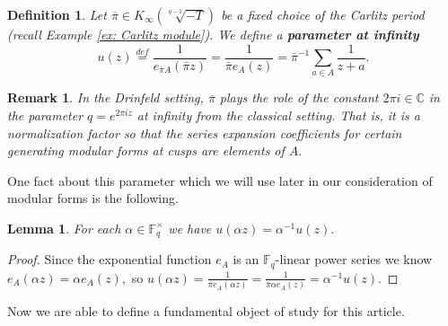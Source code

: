 \documentclass[11pt]{amsart}
\newtheorem{lemma}[theorem]{Lemma}
\newtheorem{definition}[theorem]{Definition}
\newtheorem{remark}[theorem]{Remark}
\theoremstyle{definition}
\newenvironment{psmallmatrix}
{\left(\begin{smallmatrix}}
	{\end{smallmatrix}\right)}
\numberwithin{equation}{section}
\newcommand{\GL}{\mathrm{GL}} 	%
\newcommand{\bbC}{\mathbb{C}}		%
\newcommand{\bbF}{\mathbb{F}}		%
\newcommand{\bbZ}{\mathbb{Z}}		%
\begin{document}
		\begin{definition}\label{d: parameter at infty}
			Let $\overline{\pi}\in K_{\infty}(\sqrt[q-1]{-T})$ be a fixed choice of the Carlitz period (recall Example \ref{ex: Carlitz module}). We define a \textbf{parameter at infinity} 
			\[u(z)\overset{def}{=}\frac{1}{e_{\overline{\pi}A}(\bar{\pi}z)}=\frac{1}{\bar{\pi}e_A(z)}=\bar{\pi}^{-1}\sum_{a\in A}\frac{1}{z+a}.\]
		\end{definition}
		\begin{remark}
			In the Drinfeld setting, $\overline{\pi}$ plays the role of the constant $2\pi i\in \bbC$ in the parameter $q=e^{2\pi i z}$ at infinity from the classical setting. That is, it is a normalization  factor so that the series expansion coefficients for certain generating modular forms at cusps are elements of $A.$ 
		\end{remark}
		
		One fact about this parameter which we will use later in our consideration of modular forms is the following. 
		\begin{lemma}\cite[Page $494$]{Gekeler-survey-Drinfeld-modular-forms}\label{l: u(a/d)=d/au}
			For each $\alpha\in \bbF_q^{\times}$ we have $\displaystyle{u\left(\alpha z\right)=\alpha^{-1}u(z)}.$
		\end{lemma}	
		\begin{proof}
			Since the exponential function $e_A$ is an $\bbF_q$-linear power series we know $e_A(\alpha z)=\alpha e_A(z),$ so $\displaystyle{u(\alpha z)=\frac{1}{\bar{\pi}e_A(\alpha z)}=\frac{1}{\bar{\pi}\alpha e_A(z)}=\alpha^{-1}u(z)}.$
			
			
		\end{proof}
		
		Now we are able to define a fundamental object of study for this article. 
		
\end{document}
